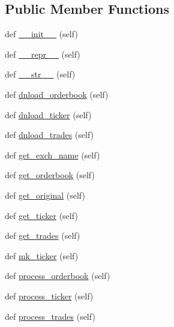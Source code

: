 \subsection*{Public Member Functions}
\begin{DoxyCompactItemize}
\item 
def \hyperlink{classexchange_1_1_exchange_adc6345bd84ea113d46f4e044dbd4d0fb}{\+\_\+\+\_\+init\+\_\+\+\_\+} (self)
\item 
def \hyperlink{classexchange_1_1_exchange_afff4d01a82947f2e3be0d4fa5e0e0fe7}{\+\_\+\+\_\+repr\+\_\+\+\_\+} (self)
\item 
def \hyperlink{classexchange_1_1_exchange_ae3fd515a25ead8667f917230b0975a98}{\+\_\+\+\_\+str\+\_\+\+\_\+} (self)
\item 
def \hyperlink{classexchange_1_1_exchange_a99f32c746467a00b455a97c7805fd710}{dnload\+\_\+orderbook} (self)
\item 
def \hyperlink{classexchange_1_1_exchange_a9e700d31fd60de495956518436b6768a}{dnload\+\_\+ticker} (self)
\item 
def \hyperlink{classexchange_1_1_exchange_a202c8b57ffa0adcb830de89d6466fd60}{dnload\+\_\+trades} (self)
\item 
def \hyperlink{classexchange_1_1_exchange_a8f095bac98d7ad212f93bfcdff458bf7}{get\+\_\+exch\+\_\+name} (self)
\item 
def \hyperlink{classexchange_1_1_exchange_a5d0c05c289d664892ade5edb03adbd6b}{get\+\_\+orderbook} (self)
\item 
def \hyperlink{classexchange_1_1_exchange_ae7690d173a46bc0f051365ab0b28f81f}{get\+\_\+original} (self)
\item 
def \hyperlink{classexchange_1_1_exchange_aabe7d5679cac0096bc54169cfceea536}{get\+\_\+ticker} (self)
\item 
def \hyperlink{classexchange_1_1_exchange_a254bac1703de55674f5ebfbb03a95e74}{get\+\_\+trades} (self)
\item 
def \hyperlink{classexchange_1_1_exchange_a31c0527e3a8a21fe74f9c24a79a86e6b}{mk\+\_\+ticker} (self)
\item 
def \hyperlink{classexchange_1_1_exchange_a93c60cd18eab808d68191fb1d2d42cf8}{process\+\_\+orderbook} (self)
\item 
def \hyperlink{classexchange_1_1_exchange_aa3f83a45154aa4a1b07010f74c2b37db}{process\+\_\+ticker} (self)
\item 
def \hyperlink{classexchange_1_1_exchange_a0e67454c7053807302be914376790484}{process\+\_\+trades} (self)
\end{DoxyCompactItemize}
